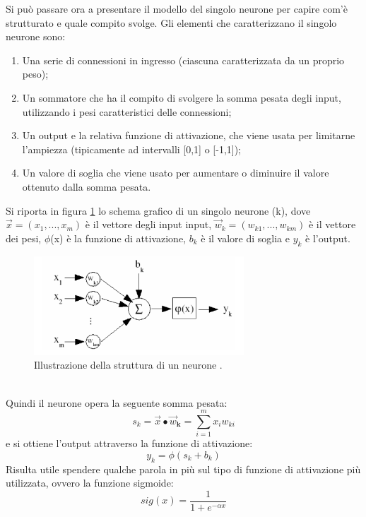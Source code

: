Si può passare ora a presentare il modello del singolo neurone per capire com'è strutturato e quale compito svolge.
Gli elementi che caratterizzano il singolo neurone sono:
\begin{enumerate}
	\item Una serie di connessioni in ingresso (ciascuna caratterizzata da un proprio peso);
	\item Un sommatore che ha il compito di svolgere la somma pesata degli input, utilizzando i pesi caratteristici delle connessioni;
	\item Un output e la relativa funzione di attivazione, che viene usata per limitarne l'ampiezza (tipicamente ad intervalli [0,1] o [-1,1]);
	\item Un valore di soglia che viene usato per aumentare o diminuire il valore ottenuto dalla somma pesata.
\end{enumerate}
Si riporta in figura \ref{schema_neurone} lo schema grafico di un singolo neurone (k), dove $\vec{x} = (x_1 ,..., x_m)$ è il vettore degli input input, $\vec{w}_k = (w_{k1} ,..., w_{km})$ è il vettore dei pesi, $\phi$(x) è la funzione di attivazione, $b_k$ è il valore di soglia e $y_k$ è l'output.
\begin{figure}[h!]
	\centering
	\includegraphics[width=0.70\textwidth]{figs/schema_neurone.png}
	\caption{Illustrazione della struttura di un neurone \cite{Intro_retiN}.}
	\label{schema_neurone}	
\end{figure} \\
Quindi il neurone opera la seguente somma pesata:
\begin{equation}
s_k = \vec{x}\bullet\vec{w}_\textbf{k} = \sum_{i=1}^{m}x_iw_{ki}
\label{sk}
\end{equation}
e si ottiene l'output attraverso la funzione di attivazione: 
\begin{equation}
y_k = \phi(s_k + b_k)
\end{equation}
Risulta utile spendere qualche parola in più sul tipo di funzione di attivazione più utilizzata, ovvero la funzione sigmoide:
\begin{equation}
sig(x) = \frac{1}{1 + e^{-{\alpha}x}}
\end{equation} 

